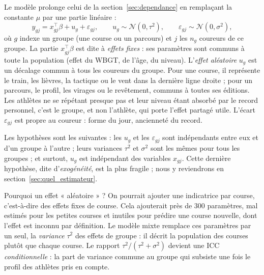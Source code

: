 \documentclass[11pt,a4paper]{article}
\begin{document}
Le modèle prolonge celui de la section~\ref{sec:dependance} en remplaçant la constante $\mu$ par une partie
linéaire :
\begin{equation}\label{eq:mixte}
y_{gj} = x_{gj}^\top\beta + u_g + \varepsilon_{gj},\qquad u_g \sim \mathcal N(0, \tau^2),\qquad
\varepsilon_{gj}\sim\mathcal N(0,\sigma^2),
\end{equation}
où $g$ indexe un groupe (une course ou un parcours) et $j$ les $n_g$ coureurs de ce groupe. La partie $x_{gj}^\top\beta$
est dite à \emph{effets fixes} : ses paramètres sont communs à toute la population (effet du WBGT, de l'âge, du
niveau). L'\emph{effet aléatoire} $u_g$ est un décalage commun à tous les coureurs du groupe. Pour une course, il
représente le train, les lièvres, la tactique ou le vent dans la dernière ligne droite ; pour un parcours, le profil,
les virages ou le revêtement, communs à toutes ses éditions. Les athlètes ne se répétant presque pas et leur niveau
étant absorbé par le record personnel, c'est le groupe, et non l'athlète, qui porte l'effet partagé utile.
L'écart $\varepsilon_{gj}$ est propre au coureur : forme du jour, ancienneté du record.

Les hypothèses sont les suivantes : les $u_g$ et les $\varepsilon_{gj}$ sont indépendants entre eux et d'un groupe à
l'autre ; leurs variances $\tau^2$ et $\sigma^2$ sont les mêmes pour tous les groupes ; et surtout, $u_g$ est
indépendant des variables $x_{gj}$. Cette dernière hypothèse, dite d'\emph{exogénéité}, est la plus fragile ; nous y
reviendrons en section~\ref{sec:quel_estimateur}.

Pourquoi un effet « aléatoire » ? On pourrait ajouter une indicatrice par course, c'est-à-dire des effets fixes de
course. Cela ajouterait près de 300 paramètres, mal estimés pour les petites courses et inutiles pour prédire une
course nouvelle, dont l'effet est inconnu par définition. Le modèle mixte remplace ces paramètres par un seul, la
\emph{variance} $\tau^2$ des effets de groupe : il décrit la population des courses plutôt que chaque course. Le
rapport $\tau^2/(\tau^2+\sigma^2)$ devient une ICC \emph{conditionnelle} : la part de variance commune au groupe qui
subsiste une fois le profil des athlètes pris en compte.
\end{document}
